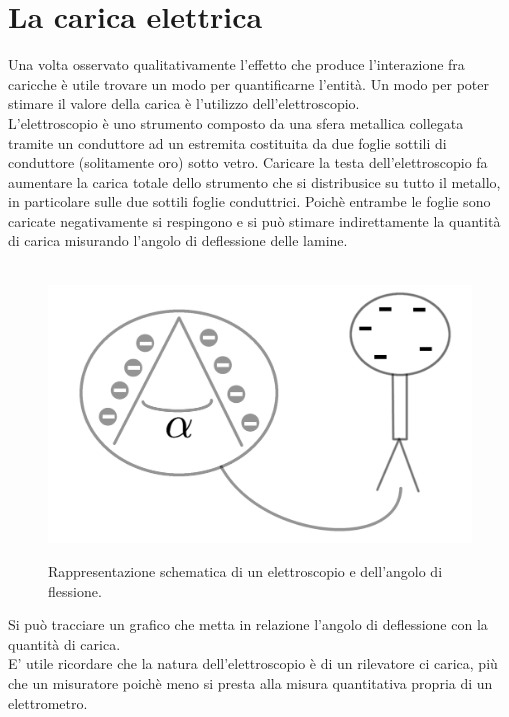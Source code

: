 \documentclass[11pt]{article}
\begin{document}
               \section{La carica elettrica}
               Una volta osservato qualitativamente l'effetto che produce l'interazione fra caricche è utile trovare un modo per quantificarne l'entità. Un modo per poter stimare il valore della carica è l'utilizzo dell'elettroscopio.\\L'elettroscopio è uno strumento composto da una sfera metallica collegata tramite un conduttore ad un estremita costituita da due foglie sottili di conduttore (solitamente oro) sotto vetro. Caricare la testa dell'elettroscopio fa aumentare la carica totale dello strumento che si distribusice su tutto il metallo, in particolare sulle due sottili foglie conduttrici. Poichè entrambe le foglie sono caricate negativamente si respingono e si può stimare indirettamente la quantità di carica misurando l'angolo di deflessione delle lamine.
               \begin{center}
\begin{figure}[H]
			  \vspace{-10pt}
              \hspace{-90pt}
              ~~~~~~~~~~~~~~~~~~~~~~~~~~~~~~~~~ \includegraphics[scale=0.22]{elettroscopio}
               \caption{\small{Rappresentazione schematica di un elettroscopio e dell'angolo di flessione.}}
               \end{figure} 
               \end{center}
               Si può tracciare un grafico che metta in relazione l'angolo di deflessione con la quantità di carica. \\E' utile ricordare che la natura dell'elettroscopio è di un rilevatore ci carica, più che un misuratore poichè meno si presta alla misura quantitativa propria di un elettrometro.
\end{document}

